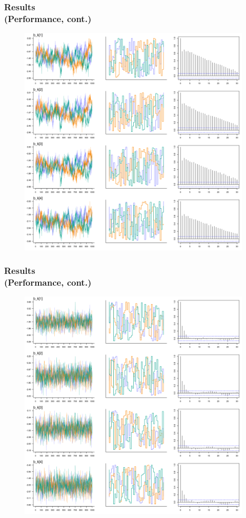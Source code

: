 \documentclass[arial,12pt,xcolor=dvipsnames]{beamer}
\begin{document}
\begin{frame}
	\frametitle{Results \\
		(Performance, cont.)}
	\begin{figure}[H]
		\centering
		\includegraphics[width=0.65\linewidth]{FOLV_CE_J100_Ndata1_bk1}
		\label{fig:FOLV_CE_chains3}
	\end{figure} 
\end{frame}
%
\begin{frame}
	\frametitle{Results \\
		(Performance, cont.)}
	\begin{figure}[H]
		\centering
		\includegraphics[width=0.65\linewidth]{FOLV_NC_J100_Ndata1_bk1}
	\end{figure} 
\end{frame}
%
\end{document}
